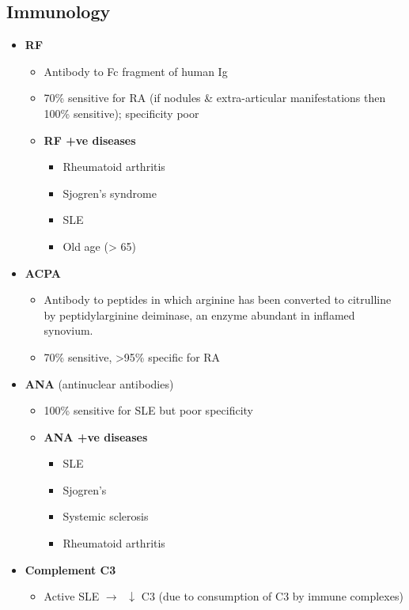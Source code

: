 \documentclass[
  12pt,
]{memoir}
\providecommand{\tightlist}{%
  \setlength{\itemsep}{0pt}\setlength{\parskip}{0pt}}
\begin{document}
\hypertarget{immunology}{%
\subsection{Immunology}\label{immunology}}

\begin{itemize}
\tightlist
\item
  \textbf{RF}

  \begin{itemize}
  \tightlist
  \item
    Antibody to Fc fragment of human Ig
  \item
    70\% sensitive for RA (if nodules \& extra-articular manifestations
    then 100\% sensitive); specificity poor
  \item
    \textbf{RF +ve diseases}

    \begin{itemize}
    \tightlist
    \item
      Rheumatoid arthritis
    \item
      Sjogren's syndrome
    \item
      SLE
    \item
      Old age (\textgreater{} 65)
    \end{itemize}
  \end{itemize}
\item
  \textbf{ACPA}

  \begin{itemize}
  \tightlist
  \item
    Antibody to peptides in which arginine has been converted to
    citrulline by peptidylarginine deiminase, an enzyme abundant in
    inflamed synovium.
  \item
    70\% sensitive, \textgreater95\% specific for RA
  \end{itemize}
\item
  \textbf{ANA} (antinuclear antibodies)

  \begin{itemize}
  \tightlist
  \item
    100\% sensitive for SLE but poor specificity
  \item
    \textbf{ANA +ve diseases}

    \begin{itemize}
    \tightlist
    \item
      SLE
    \item
      Sjogren's
    \item
      Systemic sclerosis
    \item
      Rheumatoid arthritis
    \end{itemize}
  \end{itemize}
\item
  \textbf{Complement C3}

  \begin{itemize}
  \tightlist
  \item
    Active SLE \(\rightarrow\;\;\downarrow\) C3 (due to consumption of
    C3 by immune complexes)
  \end{itemize}
\end{itemize}
\end{document}
